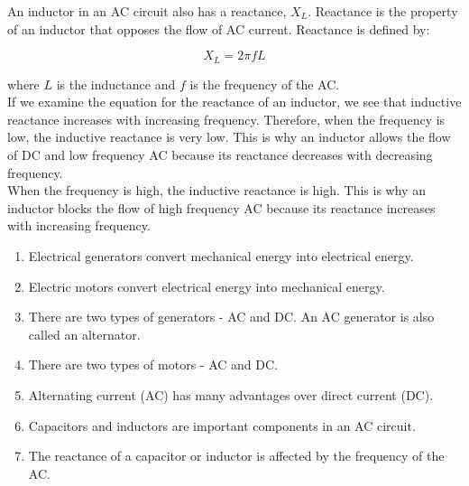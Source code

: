 An inductor in an AC circuit also has a reactance, $X_L$. Reactance is the property of an inductor that opposes the flow of AC current. Reactance is defined by:

\begin{equation*}
X_L = 2\pi fL
\end{equation*}
 
where $L$ is the inductance and $f$ is the frequency of the AC.\\
 
If we examine the equation for the reactance of an inductor, we see that inductive reactance increases with increasing frequency. Therefore, when the frequency is low, the inductive reactance is very low. This is why an inductor allows the flow of DC and low frequency AC because its reactance decreases with decreasing frequency.\\ 
 
When the frequency is high, the inductive reactance is high. This is why an inductor blocks the flow of high frequency AC because its reactance increases with increasing frequency.


\begin{enumerate}
\item Electrical generators convert mechanical energy into electrical energy.
\item Electric motors convert electrical energy into mechanical energy.
\item There are two types of generators - AC and DC. An AC generator is also called an alternator.
\item There are two types of motors - AC and DC.
\item Alternating current (AC) has many advantages over direct current (DC).
\item Capacitors and inductors are important components in an AC circuit.
\item The reactance of a capacitor or inductor is affected by the frequency of the AC.
\end{enumerate}

